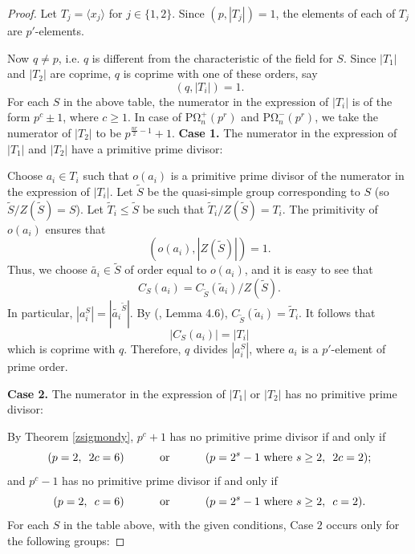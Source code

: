 \documentclass[11pt, a4paper]{article}
\numberwithin{equation}{section}
\theoremstyle{plain} %
\begin{document}
\begin{proof}
\vskip5mm
Let $T_j=\langle x_j\rangle$ for $j\in\{1,2\}$. Since $(p,|T_j|)=1$, the elements of each of $T_j$ are $p'$-elements. 

Now $q\neq p$, i.e. $q$ is different from the characteristic of the field for $S$. Since $|T_1|$ and $|T_2|$ are coprime, $q$ is coprime with one of these orders, say $$(q,|T_i|)=1.$$ 
For each $S$ in the above table, the numerator in the expression of $|T_i|$ is of the form $p^c \pm 1$, where $c\ge 1$. In case of $\mathrm{P\Omega}_n^{+}(p^r)$ and $\mathrm{P\Omega}_n^{-}(p^r)$, we take the numerator of $|T_2|$ to be $p^{\frac{nr}{2}-1}+1$. 
\vskip2mm
\noindent\textbf{Case 1.} The numerator in the expression of $|T_1|$ and $|T_2|$ have a primitive prime divisor:

 

\noindent Choose $a_i\in T_i$ such that $o(a_i)$ is a primitive prime divisor of the numerator in the expression of $|T_i|$. Let $\widetilde{S}$ be the quasi-simple group corresponding to $S$ (so $\widetilde{S}/Z(\widetilde{S})=S$). Let $\widetilde{T}_i\le \widetilde{S}$ be such that $\widetilde{T}_i/Z(\widetilde{S})=T_i$.
The primitivity of $o(a_i)$ ensures that 
$$
(o(a_i), |Z(\widetilde{S})|)=1.
$$
Thus, we choose $\tilde{a_i}\in \widetilde{S}$ of order equal to $o(a_i)$, and  it is easy to see that
$$
C_S(a_i)=C_{\widetilde{S}}(\tilde{a}_i)/Z(\widetilde{S}).
$$
In particular, $|a_i^S|=|\tilde{a_i}^{\widetilde{S}}|$. By (\cite{MR2507573}, Lemma 4.6), $C_{\widetilde{S}}(\tilde{a}_i)=\widetilde{T}_i$. It follows that 
$$
|C_{S}(a_i)|=|T_i|
$$
which is coprime with $q$. Therefore, $q$ divides $|a_i^S|$, where $a_i$ is a $p'$-element of prime order. 

 
\vskip5mm


\noindent\textbf{Case 2.} The numerator in the expression of $|T_1|$ or $|T_2|$ has no primitive prime divisor:

By Theorem \ref{zsigmondy}, $p^c+1$ has no primitive prime divisor if and only if
$$
(p=2,  \,\,\, 2c=6) \hskip1cm\mbox{ or } \hskip1cm (p=2^s-1 \mbox{ where }s\ge 2, \,\,\, 2c=2);
$$
and  $p^c-1$ has no primitive prime divisor if and only if
$$
(p=2,  \,\,\, c=6) \hskip1cm\mbox{ or } \hskip1cm (p=2^s-1 \mbox{ where }s\ge 2, \,\,\, c=2).
$$ 
For each $S$ in the table above, with the given conditions, Case $2$ occurs only for the following groups:




\end{proof}
\end{document}

